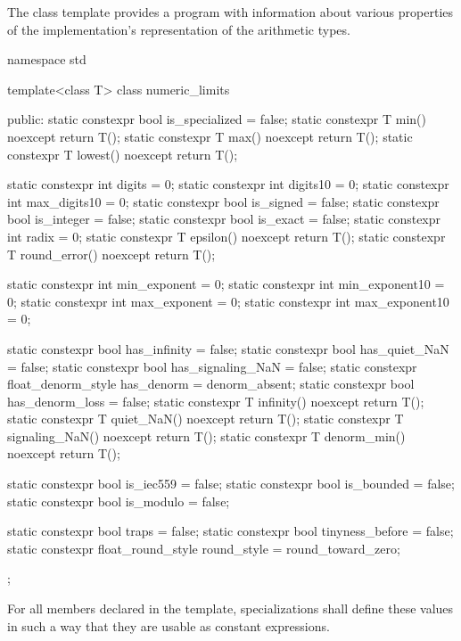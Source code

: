 \pnum
The
%
class template provides a \Cpp{} program with information about various properties of
the implementation's representation of the
arithmetic types.

%
\begin{codeblock}
namespace std {
  template<class T> class numeric_limits {
  public:
    static constexpr bool is_specialized = false;
    static constexpr T min() noexcept { return T(); }
    static constexpr T max() noexcept { return T(); }
    static constexpr T lowest() noexcept { return T(); }

    static constexpr int  digits = 0;
    static constexpr int  digits10 = 0;
    static constexpr int  max_digits10 = 0;
    static constexpr bool is_signed = false;
    static constexpr bool is_integer = false;
    static constexpr bool is_exact = false;
    static constexpr int  radix = 0;
    static constexpr T epsilon() noexcept { return T(); }
    static constexpr T round_error() noexcept { return T(); }

    static constexpr int  min_exponent = 0;
    static constexpr int  min_exponent10 = 0;
    static constexpr int  max_exponent = 0;
    static constexpr int  max_exponent10 = 0;

    static constexpr bool has_infinity = false;
    static constexpr bool has_quiet_NaN = false;
    static constexpr bool has_signaling_NaN = false;
    static constexpr float_denorm_style has_denorm = denorm_absent;
    static constexpr bool has_denorm_loss = false;
    static constexpr T infinity() noexcept { return T(); }
    static constexpr T quiet_NaN() noexcept { return T(); }
    static constexpr T signaling_NaN() noexcept { return T(); }
    static constexpr T denorm_min() noexcept { return T(); }

    static constexpr bool is_iec559 = false;
    static constexpr bool is_bounded = false;
    static constexpr bool is_modulo = false;

    static constexpr bool traps = false;
    static constexpr bool tinyness_before = false;
    static constexpr float_round_style round_style = round_toward_zero;
  };
}
\end{codeblock}

\pnum
For all members declared
 
in the
template, specializations shall define these values in such a way
that they are usable as
constant expressions.


